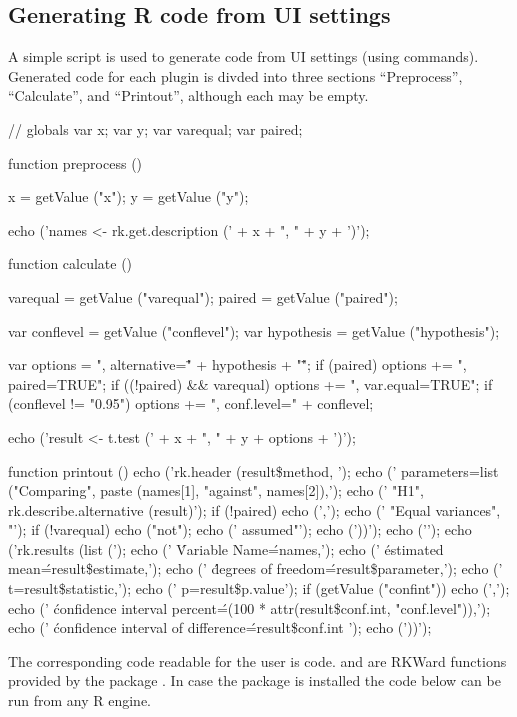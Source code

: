 \subsection{Generating R code from UI settings}
\label{sec:generating_r_code_from_ui_settings}
A simple  script is used to generate  code from UI settings (using  commands).
Generated code for each plugin is divded into three sections ``Preprocess'', ``Calculate'', and ``Printout'', although each
may be empty.
\begin{Code}
// globals
var x;
var y;
var varequal;
var paired;

function preprocess () {
  x = getValue ("x");
  y = getValue ("y");

  echo ('names <- rk.get.description (' + x + ", " + y + ')\n');
}

function calculate () {
  varequal = getValue ("varequal");
  paired = getValue ("paired");

  var conflevel = getValue ("conflevel");
  var hypothesis = getValue ("hypothesis");

  var options = ", alternative=\"" + hypothesis + "\"";
  if (paired) options += ", paired=TRUE";
  if ((!paired) && varequal) options += ", var.equal=TRUE";
  if (conflevel != "0.95") options += ", conf.level=" + conflevel;

  echo ('result <- t.test (' + x + ", " + y + options + ')\n');
}

function printout () {
  echo ('rk.header (result\$method, \n');
  echo ('  parameters=list ("Comparing", paste (names[1], "against", names[2]),\n');
  echo ('  "H1", rk.describe.alternative (result)');
  if (!paired) {
    echo (',\n');
    echo ('  "Equal variances", "');
    if (!varequal) echo ("not");
    echo (' assumed"');
  }
  echo ('))\n');
  echo ('\n');
  echo ('rk.results (list (\n');
  echo ('  \'Variable Name\'=names,\n');
  echo ('  \'estimated mean\'=result\$estimate,\n');
  echo ('  \'degrees of freedom\'=result\$parameter,\n');
  echo ('  t=result\$statistic,\n');
  echo ('  p=result\$p.value');
  if (getValue ("confint")) {
    echo (',\n');
    echo ('  \'confidence interval percent\'=(100 * attr(result\$conf.int, "conf.level")),\n');
    echo ('  \'confidence interval of difference\'=result\$conf.int ');
  }
  echo ('))\n');
}
\end{Code}

The corresponding code readable for the user is  code. and  
are RKWard functions provided by the package . In case the package is installed the code below 
can be run from any R engine.

